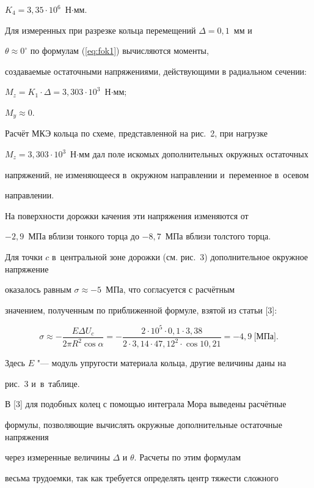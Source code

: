 $K_4 =3,35\cdot 10^6$~Н$\cdot$мм.

Для измеренных при разрезке кольца перемещений $\Delta =0,1$~мм и

$\theta\approx 0^\circ$ по формулам (\ref{eq:fok1}) вычисляются моменты,

создаваемые остаточными напряжениями, действующими в радиальном сечении:

$M_z =K_1 \cdot \Delta=3,303\cdot 10^3$~Н$\cdot$мм;

$M_y \approx 0$.

Расчёт МКЭ кольца по схеме, представленной на рис.~2, при нагрузке

$M_z =3,303\cdot10^3$~Н$\cdot$мм дал поле искомых дополнительных окружных остаточных

напряжений, не изменяющееся в~окружном направлении и~переменное в~осевом

направлении.

На поверхности дорожки качения эти напряжения изменяются от

$-2,9$~МПа вблизи тонкого торца до $-8,7$~МПа вблизи толстого торца.

Для точки $c$ в~центральной зоне дорожки (см. рис.~3) дополнительное окружное напряжение

оказалось равным $\sigma \approx -5$~МПа, что согласуется с расчётным

значением, полученным по приближенной формуле, взятой из статьи [3]:

\begin{equation}

\sigma \approx -\frac{E \Delta U_c }{2\pi R^2\cos \alpha}=

-\frac{2\cdot 10^5\cdot 0,1\cdot 3,38}{2\cdot 3,14\cdot 47,12^2\cdot \cos

10,21}=-4,9~\text{[МПа]}.

\end{equation}

Здесь $E$ "--- модуль упругости материала кольца, другие величины даны на

рис.~3 и~в~таблице.



В [3] для подобных колец с помощью интеграла Мора выведены расчётные

формулы, позволяющие вычислять окружные дополнительные остаточные напряжения

через измеренные величины $\Delta $ и $\theta $. Расчеты по этим формулам

весьма трудоемки, так как требуется определять центр тяжести сложного

